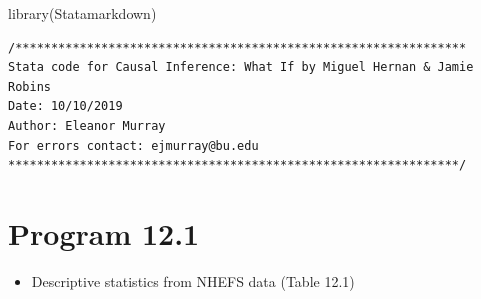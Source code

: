 \documentclass[
  10pt,
]{book}
\newenvironment{Shaded}{\begin{snugshade}}{\end{snugshade}}
\newcommand{\FunctionTok}[1]{\textcolor[rgb]{0.00,0.00,0.00}{#1}}
\newcommand{\NormalTok}[1]{#1}
\providecommand{\tightlist}{%
  \setlength{\itemsep}{0pt}\setlength{\parskip}{0pt}}
\begin{document}
\begin{Shaded}
\begin{Highlighting}[]
\FunctionTok{library}\NormalTok{(Statamarkdown)}
\end{Highlighting}
\end{Shaded}

\begin{verbatim}
/***************************************************************
Stata code for Causal Inference: What If by Miguel Hernan & Jamie Robins
Date: 10/10/2019
Author: Eleanor Murray 
For errors contact: ejmurray@bu.edu
***************************************************************/
\end{verbatim}

\hypertarget{program-12.1-1}{%
\section{Program 12.1}\label{program-12.1-1}}

\begin{itemize}
\tightlist
\item
  Descriptive statistics from NHEFS data (Table 12.1)
\end{itemize}
\end{document}
